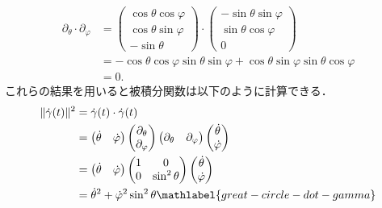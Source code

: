 \documentclass{ltjsbook}
\begin{document}
\begin{align*}
    \partial_\theta \cdot \partial_\varphi
    &=
    \begin{pmatrix}
        \cos \theta \cos \varphi \\
        \cos \theta \sin \varphi \\
        - \sin \theta
    \end{pmatrix}
    \cdot
    \begin{pmatrix}
        - \sin \theta \sin \varphi \\
        \sin \theta \cos \varphi \\
        0
    \end{pmatrix} \\
    &= - \cos \theta \cos \varphi \sin \theta \sin \varphi
       + \cos \theta \sin \varphi \sin \theta \cos \varphi \\
    &= 0.
\end{align*}
これらの結果を用いると被積分関数は以下のように計算できる．
\begin{align}
    \lVert \dot{\gamma}(t) \rVert^2
    &= \dot{\gamma}(t) \cdot \dot{\gamma}(t) \notag \\
    &= \begin{pmatrix}
            \dot{\theta} & \dot{\varphi}
        \end{pmatrix}
        \begin{pmatrix}
            \partial_\theta \\ \partial_\varphi
        \end{pmatrix}
        \begin{pmatrix}
            \partial_\theta & \partial_\varphi
        \end{pmatrix}
        \begin{pmatrix}
            \dot{\theta} \\ \dot{\varphi}
        \end{pmatrix} \notag \\
    &= \begin{pmatrix}
            \dot{\theta} & \dot{\varphi}
        \end{pmatrix}
        \begin{pmatrix}
            1 & 0 \\
            0 & \sin^2 \theta \\
        \end{pmatrix}
        \begin{pmatrix}
            \dot{\theta} \\ \dot{\varphi}
        \end{pmatrix} \notag \\
    &=  \dot{\theta}^2 + \dot{\varphi}^2 \sin^2 \theta \mathlabel{great-circle-dot-gamma}
\end{align}
\end{document}
